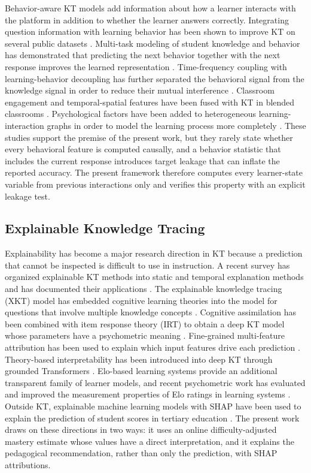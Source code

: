 \documentclass[11pt]{article}
\begin{document}
Behavior-aware KT models add information about how a learner interacts with the platform in addition to whether the learner answers correctly. Integrating question information with learning behavior has been shown to improve KT on several public datasets \cite{su2025integrate}. Multi-task modeling of student knowledge and behavior has demonstrated that predicting the next behavior together with the next response improves the learned representation \cite{zhao2024multitask}. Time-frequency coupling with learning-behavior decoupling has further separated the behavioral signal from the knowledge signal in order to reduce their mutual interference \cite{huang2026timefrequency}. Classroom engagement and temporal-spatial features have been fused with KT in blended classrooms \cite{shou2024research}. Psychological factors have been added to heterogeneous learning-interaction graphs in order to model the learning process more completely \cite{wang2024psychological}. These studies support the premise of the present work, but they rarely state whether every behavioral feature is computed causally, and a behavior statistic that includes the current response introduces target leakage that can inflate the reported accuracy. The present framework therefore computes every learner-state variable from previous interactions only and verifies this property with an explicit leakage test.

\subsection{Explainable Knowledge Tracing}

Explainability has become a major research direction in KT because a prediction that cannot be inspected is difficult to use in instruction. A recent survey has organized explainable KT methods into static and temporal explanation methods and has documented their applications \cite{li2025survey}. The explainable knowledge tracing (XKT) model has embedded cognitive learning theories into the model for questions that involve multiple knowledge concepts \cite{huang2024xkt}. Cognitive assimilation has been combined with item response theory (IRT) to obtain a deep KT model whose parameters have a psychometric meaning \cite{guo2025deep}. Fine-grained multi-feature attribution has been used to explain which input features drive each prediction \cite{liang2026interpretable}. Theory-based interpretability has been introduced into deep KT through grounded Transformers \cite{labra2026theory}. Elo-based learning systems provide an additional transparent family of learner models, and recent psychometric work has evaluated and improved the measurement properties of Elo ratings in learning systems \cite{bolsinova2025keeping}. Outside KT, explainable machine learning models with SHAP have been used to explain the prediction of student scores in tertiary education \cite{ghimire2024explainable}. The present work draws on these directions in two ways: it uses an online difficulty-adjusted mastery estimate whose values have a direct interpretation, and it explains the pedagogical recommendation, rather than only the prediction, with SHAP attributions.
\end{document}
